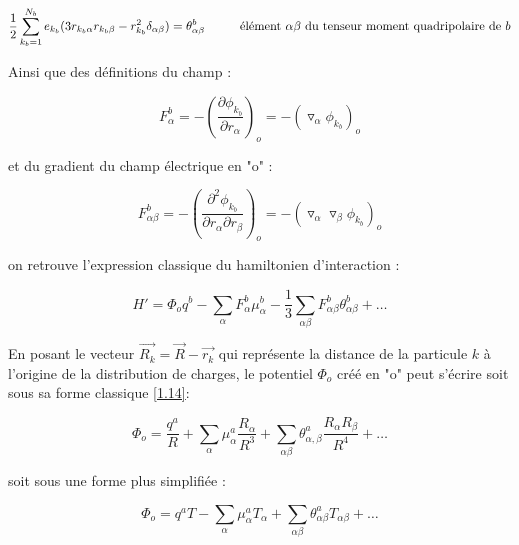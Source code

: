 	
	\begin{flushleft}
		\begin{equation*}
		\frac{1}{2} \sum_{k_{b}=1}^{N_{b}} e_{k_{b}} (3r_{k_{b}\alpha} r_{k_{b}\beta}- r^{2}_{k_{b}}\delta_{\alpha \beta}) = \theta_{\alpha \beta}^{b}  \hspace{1cm} \textup{élément $\alpha\beta$ du tenseur moment quadripolaire de $b$}
		\end{equation*}
	\end{flushleft}
	
	Ainsi que des définitions du champ :
	
	\begin{equation}
	F_{\alpha}^{b} = - \left(\frac{\partial \phi_{k_{b}}}{\partial r_{\alpha}}\right)_{o} = - (\triangledown_{\alpha} \phi_{k_{b}})_{o} \label{1.11}
	\end{equation}
	
	et du gradient du champ électrique en "o" : 
	
	\begin{equation}
	F_{\alpha\beta}^{b} = - \left(\frac{\partial^{2} \phi_{k_{b}}}{\partial r_{\alpha} \partial r_{\beta}}\right)_{o} = - (\triangledown_{\alpha} \triangledown_{\beta} \phi_{k_{b}})_{o} \label{1.12}
	\end{equation}
	
	on retrouve l'expression classique du hamiltonien d'interaction : 
	
	\begin{equation}
	H' = \Phi_{o} q^{b} - \sum_{\alpha} F_{\alpha}^{b} \mu_{\alpha}^{b} - \frac{1}{3} \sum_{\alpha\beta} F_{\alpha\beta}^{b} \theta_{\alpha\beta}^{b} + \ldots
	\end{equation}
	
	En posant le vecteur $\overrightarrow{R_{k}}= \overrightarrow{R} - \overrightarrow{r_{k}}$ qui représente la distance de la particule $k$ à l'origine de la distribution de charges, le potentiel $\Phi_{o}$ créé en "o" peut s'écrire soit sous sa forme classique \ref{1.14}:
	
	\begin{equation}
	\Phi_{o} = \frac{q^{a}}{R} + \sum_{\alpha} \mu_{\alpha}^{a} \frac{R_{\alpha}}{R^{3}} + \sum_{\alpha\beta} \theta_{\alpha,\beta}^{a} \frac{R_{\alpha} R_{\beta}}{R^{4}} + \ldots \label{1.14}
	\end{equation}
	
	soit sous une forme plus simplifiée : 
	
	\begin{equation}
	\Phi_{o} = q^{a} T - \sum_{\alpha} \mu_{\alpha}^{a} T_{\alpha} + \sum_{\alpha\beta} \theta_{\alpha\beta}^{a} T_{\alpha\beta} + \ldots
	\end{equation}
	
